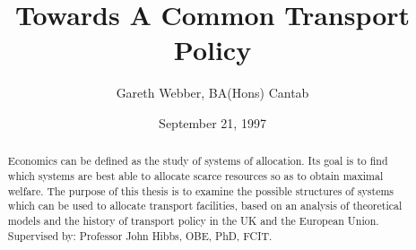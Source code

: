 \documentclass[12pt,a4paper]{report}
\begin{document}
\title{Towards A Common Transport Policy}
\author{Gareth Webber, BA(Hons) Cantab}
\date{September 21, 1997}

\maketitle
\begin{abstract}
Economics can be defined as the study of systems of allocation. Its goal is to find which systems are best able to allocate scarce resources so as to obtain maximal welfare. The purpose of this thesis is to examine the possible structures of systems which can be used to allocate transport facilities, based on an analysis of theoretical models and the history of transport policy in the UK and the European Union.
Supervised by: Professor John Hibbs, OBE, PhD, FCIT.
\end{abstract}


	
		






\end{document}
